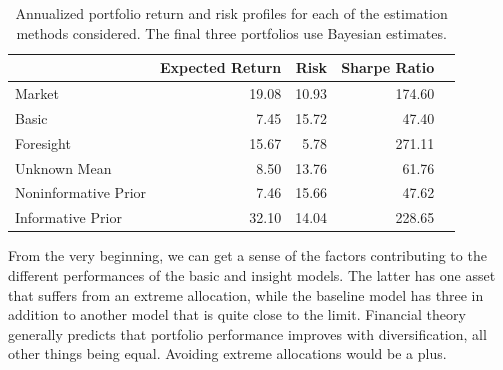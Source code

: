 \documentclass[a4paper]{article}\usepackage[]{graphicx}\usepackage[]{color}
\begin{document}
\begin{table}
    \centering
\begin{tabular}{lrrrr}
  \hline
 & Expected Return & Risk & Sharpe Ratio \\ 
  \hline
Market & 19.08 & 10.93 & 174.60\\ 
  Basic & 7.45 & 15.72 & 47.40 \\ 
  Foresight & 15.67 & 5.78 & 271.11 \\ 
  Unknown Mean & 8.50 & 13.76 & 61.76 \\ 
  Noninformative Prior & 7.46 & 15.66 & 47.62 \\ 
  Informative Prior & 32.10 & 14.04 & 228.65 \\ 
   \hline
\end{tabular}
    \caption{Annualized portfolio return and risk profiles for each of the estimation methods considered. The final three portfolios use Bayesian estimates.}
    \label{tab:results}
\end{table}

\begin{table}
    \centering
    \caption{Asset allocations for each of the portfolios in this project. The final three portfolios use Bayesian methods.}
    \label{tab:weights}
\end{table}

From the very beginning, we can get a sense of the factors contributing to the different performances of the basic and insight models. The latter has one asset that suffers from an extreme allocation, while the baseline model has three in addition to another model that is quite close to the limit. Financial theory generally predicts that portfolio performance improves with diversification, all other things being equal. Avoiding extreme allocations would be a plus.
\end{document}
